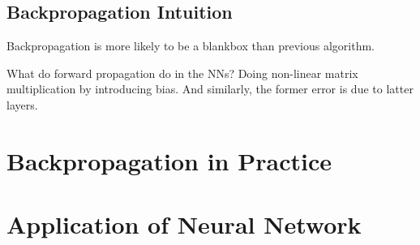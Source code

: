 \documentclass[en,11pt,english,black,simple]{../elegantbook}
\begin{document}
\subsection{Backpropagation Intuition}

Backpropagation is more likely to be a blankbox than previous algorithm.  

What do forward propagation do in the NNs? Doing non-linear matrix multiplication by introducing bias. And similarly, the former error is due to latter layers. 

\section{Backpropagation in Practice}

\section{Application of Neural Network}



\let\chapname\undefined
\ifx\mainclass\undefined
\end{document}
